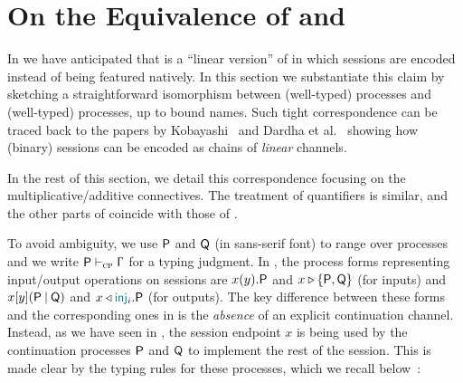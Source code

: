 \section{On the Equivalence of \LCC and \CP}
\label{sec:equivalence}

In  we have anticipated that \LCC is a ``linear version''
of \CP in which sessions are encoded instead of being featured natively. In this
section we substantiate this claim by sketching a straightforward isomorphism
between (well-typed) \CP processes and (well-typed) \LCC processes, up to bound
names. Such tight correspondence can be traced back to the papers by
Kobayashi~\cite{Kobayashi02b} and Dardha et al.~\cite{DardhaGiachinoSangiorgi17}
showing how (binary) sessions can be encoded as chains of \emph{linear}
channels.

In the rest of this section, we detail this correspondence focusing on the
multiplicative/additive connectives. The treatment of quantifiers is similar,
and the other parts of \LCC coincide with those of \CP.

To avoid ambiguity, we use $\mathsf{P}$ and $\mathsf{Q}$ (in sans-serif font)
to range over \CP processes and we write $\wtcp\ClassicalP\Context$ for a \CP
typing judgment. In \CP, the process forms representing input/output operations
on sessions are $\Join\x\y{}.\ClassicalP$ and $\Case\x{}\ClassicalP\ClassicalQ$
(for inputs) and $\Fork\x\y{}\ClassicalP\ClassicalQ$ and
$\Select\x{\InTag_i}{}.\ClassicalP$ (for outputs). The key difference between
these forms and the corresponding ones in \LCC is the \emph{absence} of an
explicit continuation channel. Instead, as we have seen in ,
the session endpoint $x$ is being used by the continuation processes
$\mathsf{P}$ and $\mathsf{Q}$ to implement the rest of the session. This is
made clear by the \CP typing rules for these processes, which we recall
below~\cite{Wadler14}:

